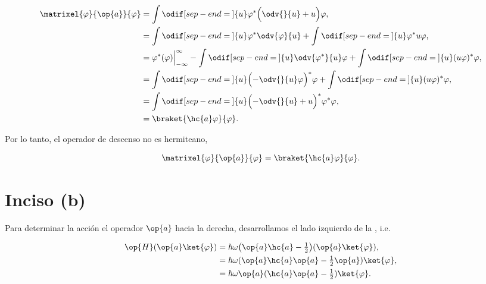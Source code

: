 \documentclass[../main.tex]{subfiles}
\begin{document}
\begin{problema}[30]
	\begin{align*}
		\matrixel{\varphi}{\op{a}}{\varphi} & = \int \odif[sep-end=\medspace]{u} \varphi^{*}\Bigl(\odv{}{u} + u\Bigr)\varphi,                                                                                               \\
		                                    & = \int \odif[sep-end=\medspace]{u} \varphi^{*}\odv{\varphi}{u} + \int \odif[sep-end=\medspace]{u} \varphi^{*}u\varphi,                                                        \\
		                                    & = \varphi^{*}(\varphi)\Bigr\rvert_{-\infty}^{\infty}  - \int\odif[sep-end=\medspace]{u} \odv{\varphi^{*}}{u}\varphi + \int \odif[sep-end=\medspace]{u} (u\varphi)^{*}\varphi, \\
		                                    & = \int \odif[sep-end=\medspace]{u} \Bigl(-\odv{}{u}\varphi\Bigr)^{*}\varphi + \int \odif[sep-end=\medspace]{u} (u\varphi)^{*}\varphi,                                         \\
		                                    & = \int \odif[sep-end=\medspace]{u} \Bigl(-\odv{}{u} + u\Bigr)^{*}\varphi^{*}\varphi,                                                                                          \\
		                                    & = \braket{\hc{a}\varphi}{\varphi}.
	\end{align*}

	Por lo tanto, el operador de descenso no es hermiteano,

	\begin{equation*}
		\matrixel{\varphi}{\op{a}}{\varphi} = \braket{\hc{a}\varphi}{\varphi}.
	\end{equation*}

	\section{Inciso (b)}

	Para determinar la acción el operador \(\op{a}\) hacia la derecha, desarrollamos
	el lado izquierdo de la , i.e.

	\begin{align*}
		\op{H}(\op{a}\ket{\varphi}) & = \hbar\omega \bigl(\op{a}\hc{a} - \tfrac{1}{2}\bigr)(\op{a}\ket{\varphi}), \\
		                            & = \hbar\omega(\op{a}\hc{a}\op{a} - \tfrac{1}{2}\op{a})\ket{\varphi},        \\
		                            & = \hbar\omega \op{a}(\hc{a}\op{a} - \tfrac{1}{2})\ket{\varphi}.
	\end{align*}


\end{problema}
\end{document}
